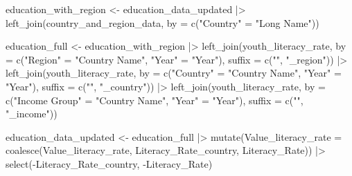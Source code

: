 \documentclass[
  letterpaper,
  DIV=11,
  numbers=noendperiod]{scrartcl}
\newenvironment{Shaded}{\begin{snugshade}}{\end{snugshade}}
\newcommand{\AttributeTok}[1]{\textcolor[rgb]{0.40,0.45,0.13}{#1}}
\newcommand{\FunctionTok}[1]{\textcolor[rgb]{0.28,0.35,0.67}{#1}}
\newcommand{\NormalTok}[1]{\textcolor[rgb]{0.00,0.23,0.31}{#1}}
\newcommand{\OtherTok}[1]{\textcolor[rgb]{0.00,0.23,0.31}{#1}}
\newcommand{\SpecialCharTok}[1]{\textcolor[rgb]{0.37,0.37,0.37}{#1}}
\newcommand{\StringTok}[1]{\textcolor[rgb]{0.13,0.47,0.30}{#1}}
\begin{document}
\begin{Shaded}
\begin{Highlighting}[]
\NormalTok{education\_with\_region }\OtherTok{\textless{}{-}}\NormalTok{ education\_data\_updated }\SpecialCharTok{|\textgreater{}}
  \FunctionTok{left\_join}\NormalTok{(country\_and\_region\_data, }\AttributeTok{by =} \FunctionTok{c}\NormalTok{(}\StringTok{"Country"} \OtherTok{=} \StringTok{"Long Name"}\NormalTok{))}

\NormalTok{education\_full }\OtherTok{\textless{}{-}}\NormalTok{ education\_with\_region }\SpecialCharTok{|\textgreater{}}
  \FunctionTok{left\_join}\NormalTok{(youth\_literacy\_rate, }
            \AttributeTok{by =} \FunctionTok{c}\NormalTok{(}\StringTok{"Region"} \OtherTok{=} \StringTok{"Country Name"}\NormalTok{, }\StringTok{"Year"} \OtherTok{=} \StringTok{"Year"}\NormalTok{),  }
            \AttributeTok{suffix =} \FunctionTok{c}\NormalTok{(}\StringTok{""}\NormalTok{, }\StringTok{"\_region"}\NormalTok{)) }\SpecialCharTok{|\textgreater{}}
  \FunctionTok{left\_join}\NormalTok{(youth\_literacy\_rate, }
            \AttributeTok{by =} \FunctionTok{c}\NormalTok{(}\StringTok{"Country"} \OtherTok{=} \StringTok{"Country Name"}\NormalTok{, }\StringTok{"Year"} \OtherTok{=} \StringTok{"Year"}\NormalTok{), }
            \AttributeTok{suffix =} \FunctionTok{c}\NormalTok{(}\StringTok{""}\NormalTok{, }\StringTok{"\_country"}\NormalTok{)) }\SpecialCharTok{|\textgreater{}}
  \FunctionTok{left\_join}\NormalTok{(youth\_literacy\_rate,}
            \AttributeTok{by =} \FunctionTok{c}\NormalTok{(}\StringTok{"Income Group"} \OtherTok{=} \StringTok{"Country Name"}\NormalTok{, }\StringTok{"Year"} \OtherTok{=} \StringTok{"Year"}\NormalTok{), }
            \AttributeTok{suffix =} \FunctionTok{c}\NormalTok{(}\StringTok{""}\NormalTok{, }\StringTok{"\_income"}\NormalTok{))}

\NormalTok{education\_data\_updated }\OtherTok{\textless{}{-}}\NormalTok{ education\_full }\SpecialCharTok{|\textgreater{}}
  \FunctionTok{mutate}\NormalTok{(}\AttributeTok{Value\_literacy\_rate =} \FunctionTok{coalesce}\NormalTok{(Value\_literacy\_rate, }
\NormalTok{                                        Literacy\_Rate\_country, }
\NormalTok{                                        Literacy\_Rate)) }\SpecialCharTok{|\textgreater{}}
  \FunctionTok{select}\NormalTok{(}\SpecialCharTok{{-}}\NormalTok{Literacy\_Rate\_country, }\SpecialCharTok{{-}}\NormalTok{Literacy\_Rate)  }


\end{Highlighting}
\end{Shaded}
\end{document}
